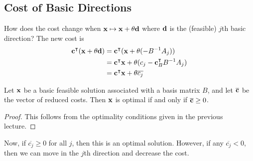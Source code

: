 \subsection{Cost of Basic Directions}
How does the cost change when \( \vb x \mapsto \vb x + \theta \vb d \) where \( \vb d \) is the (feasible) \( j \)th basic direction?
The new cost is
\begin{align*}
    \vb c^\intercal (\vb x + \theta \vb d) &= \vb c^\intercal (\vb x + \theta (-B^{-1}A_j)) \\
    &= \vb c^\intercal \vb x + \theta (c_j - \vb c_B^\intercal B^{-1} A_j) \\
    &= \vb c^\intercal \vb x + \theta \overline{c_j} \\
\end{align*}
\begin{theorem}
    Let \( \vb x \) be a basic feasible solution associated with a basis matrix \( B \), and let \( \overline{\vb c} \) be the vector of reduced costs.
    Then \( \vb x \) is optimal if and only if \( \overline{\vb c} \geq 0 \).
\end{theorem}
\begin{proof}
    This follows from the optimality conditions given in the previous lecture.
\end{proof}
Now, if \( \overline{c_j} \geq 0 \) for all \( j \), then this is an optimal solution.
However, if any \( \overline{c_j} < 0 \), then we can move in the \( j \)th direction and decrease the cost.

